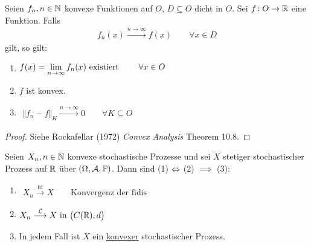 \begin{theorem}\label{theorem9.8}
	Seien $f_n,n\in\mathbb{N}$ konvexe Funktionen auf $O$, $D\subseteq O$ dicht in $O$.
	Sei $f\colon O\to\mathbb{R}$ eine Funktion.
	Falls 
	\begin{align}\label{eqtheorem9.8Stern}\tag{$\ast$}
		f_n(x)\overset{n\to\infty}{\longrightarrow} f(x)\qquad\forall x\in D
	\end{align}
	gilt, so gilt:
	\begin{enumerate}[label=(\arabic*)]
		\item $\begin{aligned}
			f(x)=\lim\limits_{n\to\infty} f_n(x)\text{ existiert }\qquad\forall x\in O
		\end{aligned}$
		\item $f$ ist konvex.
		\item $\begin{aligned}
			\big\Vert f_n-f\big\Vert_K\overset{n\to\infty}{\longrightarrow}0\qquad\forall K\subseteq O
		\end{aligned}$
	\end{enumerate}
\end{theorem}


\begin{proof}
	Siehe Rockafellar (1972) \textit{Convex Analysis} Theorem 10.8.
\end{proof}

\begin{satz}\label{satz9.9}
	Seien $X_n,n\in\mathbb{N}$ konvexe stochastische Prozesse und sei $X$ stetiger stochastischer Prozess auf $\mathbb{R}$ über $(\Omega,\mathcal{A},\mathbb{P})$.
	Dann sind (1) $\Leftrightarrow$ (2) $\implies$ (3):
	\begin{enumerate}[label=(\arabic*)]
		\item $\begin{aligned}
			X_n\overset{\text{fd}}{\longrightarrow}X\qquad\text{Konvergenz der fidis}
		\end{aligned}$
		\item $\begin{aligned}
			X_n\overset{\mathcal{L}}{\longrightarrow} X\text{ in }\big(C(\mathbb{R}),d\big)
		\end{aligned}$
		\item In jedem Fall ist $X$ ein \underline{konvexer} stochastischer Prozess.
	\end{enumerate}
\end{satz}

